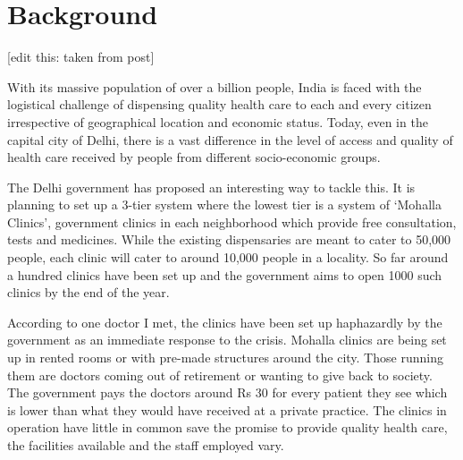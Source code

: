 \section{Background}

\begin{comment}
Your paper may or may not need this section, but if you think that it might benefit from it, err on the side of caution. Write about the story behind your research. Build up the context that the reader could read, like a story, to understand more about the problem you’re addressing, the phenomena you are talking about. If the paper is about an internet ban in Bangladesh, tell the story about how the ban was put in place, what was the timeline like, who said what in popular press, and so on. If the research was conducted in the context of an organization of health/outreach workers, talk about the organization, its charter, what it has done/is doing. If the paper is about a particular tech practice, such as emoji communication amongst Chinese users, talk about the history of mobile communication in that context (in addition to what you will say in the Related Work section). If the paper is about a tool that was deployed and evaluated, write about the tool and elaborate on its features.
\end{comment}

\textcolor{red}{}

[edit this: taken from post]

With its massive population of over a billion people, India is faced with the logistical challenge of dispensing quality health care to each and every citizen irrespective of geographical location and economic status. Today, even in the capital city of Delhi, there is a vast difference in the level of access and quality of health care received by people from different socio-economic groups.

The Delhi government has proposed an interesting way to tackle this. It is planning to set up a 3-tier system where the lowest tier is a system of ‘Mohalla Clinics’, government clinics in each neighborhood which provide free consultation, tests and medicines. While the existing dispensaries are meant to cater to 50,000 people, each clinic will cater to around 10,000 people in a locality. So far around a hundred clinics have been set up and the government aims to open 1000 such clinics by the end of the year.

According to one doctor I met, the clinics have been set up haphazardly by the government as an immediate response to the crisis. Mohalla clinics are being set up in rented rooms or with pre-made structures around the city. Those running them are doctors coming out of retirement or wanting to give back to society. The government pays the doctors around Rs 30 for every patient they see which is lower than what they would have received at a private practice. The clinics in operation have little in common save the promise to provide quality health care, the facilities available and the staff employed vary.

